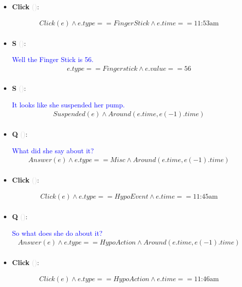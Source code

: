 \documentclass[11pt]{article}
\newcounter{CQ}
\newcounter{CS}
\newcounter{CClick}
\newcommand{\key}[1]{\textcolor{lightgray}{#1}}
\begin{document}
\begin{itemize}
	
	\item
	\textbf{Click\theCClick} \key{()}: \addtocounter{CClick}{1}
	
	\begin{multline*}
	Click(e) \wedge e.type == FingerStick \wedge e.time == \mbox{11:53am} \\
	\end{multline*}
	
	\item
	\textbf{S\theCS} \key{()}: \addtocounter{CS}{1}
	\textcolor{blue}{ Well the Finger Stick is 56. }
	\begin{multline*}
	e.type==Fingerstick \wedge e.value==56 \\
	\end{multline*}
    
    \item
    \textbf{S\theCS} \key{()}: \addtocounter{CS}{1}
    \textcolor{blue}{ It looks like she suspended her pump. }
    \begin{multline*}
    Suspended(e) \wedge Around(e.time, e(-1).time)\\
    \end{multline*}
    
    \item
    \textbf{Q\theCQ} \key{()}: \addtocounter{CQ}{1}
    \textcolor{blue}{ What did she say about it? }
    \begin{multline*}
    Answer(e) \wedge e.type == Misc \wedge Around(e.time, e(-1).time) \\
    \end{multline*}
	
	\item
	\textbf{Click\theCClick} \key{()}: \addtocounter{CClick}{1}
	\begin{multline*}
	Click(e) \wedge e.type == HypoEvent \wedge e.time == \mbox{11:45am} \\
	\end{multline*}
	
    
    \item
    \textbf{Q\theCQ} \key{()}: \addtocounter{CQ}{1}
    \textcolor{blue}{ So what does she do about it? }
    \begin{multline*}
    Answer(e) \wedge e.type == HypoAction \wedge Around(e.time, e(-1).time)  \\
    \end{multline*}
	

	
	\item
	\textbf{Click\theCClick} \key{()}: \addtocounter{CClick}{1}
	\begin{multline*}
	Click(e) \wedge e.type == HypoAction \wedge e.time == \mbox{11:46am} \\
	\end{multline*}
	

\end{itemize}
\end{document}
